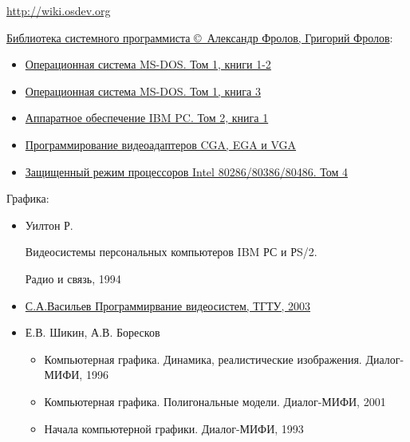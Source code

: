 \secdown


\url{http://wiki.osdev.org}

\bigskip

\href{http://www.frolov-lib.ru/bsp.html}{Библиотека системного программиста
\copyright\ Александр Фролов, Григорий Фролов}:

\begin{itemize}[nosep]
  \item \href{http://www.frolov-lib.ru/books/bsp/v01a/index.html}{Операционная
  система MS-DOS. Том 1, книги 1-2}
  \item \href{http://www.frolov-lib.ru/books/bsp/v01b/index.html}{Операционная
  система MS-DOS. Том 1, книга 3}
  \item \href{http://www.frolov-lib.ru/books/bsp/v02/index.html}{Аппаратное
  обеспечение IBM PC. Том 2, книга 1}
  \item \href{http://www.frolov-lib.ru/books/bsp/v03/index.html}{Программирование видеоадаптеров CGA, EGA и VGA}
  \item \href{http://www.frolov-lib.ru/books/bsp/v06/index.html}{Защищенный
  режим процессоров Intel 80286/80386/80486. Том 4}
\end{itemize}

\bigskip

Графика:

\begin{itemize}

\item 
Уилтон Р. 

Видеосистемы персональных компьютеров IBM РС и РS/2.

Радио и связь, 1994

\item

\href{http://ict.informika.ru/ft/004761/vasilev.pdf}{С.А.Васильев
Программирвание видеосистем, ТГТУ, 2003}

\item

Е.В. Шикин, А.В. Боресков

\begin{itemize}[nosep]
\item Компьютерная графика. Динамика, реалистические изображения.
Диалог-МИФИ, 1996
\item Компьютерная графика. Полигональные модели. Диалог-МИФИ, 2001
\item Начала компьютерной графики. Диалог-МИФИ, 1993
\end{itemize}

\end{itemize}

